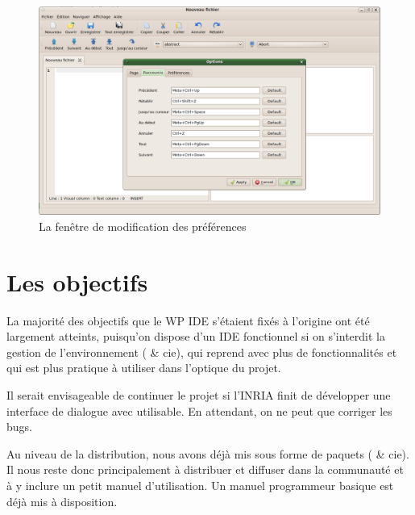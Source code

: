         \begin{figure}[ht]
            \centering
            \includegraphics[scale=0.3]{../images/ide/settings.png}
            \caption{La fenêtre de modification des préférences}
            \label{fig:settings}
        \end{figure}

\section{Les objectifs}

La majorité des objectifs que le WP IDE s'étaient fixés à l'origine ont été largement atteints, puisqu'on dispose d'un IDE fonctionnel si on s'interdit la gestion de l'environnement ( \& cie),  qui reprend \coqide{} avec plus de fonctionnalités et qui est plus pratique à utiliser dans l'optique du projet.

Il serait envisageable de continuer le projet si l'INRIA finit de développer une interface de dialogue avec \coq{} utilisable.
En attendant, on ne peut que corriger les bugs.

Au niveau de la distribution, nous avons déjà mis \coquille{} sous forme de paquets ( \& cie). Il nous reste donc principalement à distribuer et diffuser \coquille{} dans la communauté \coq{} et à y inclure un petit manuel d'utilisation. Un manuel programmeur basique est déjà mis à disposition.

